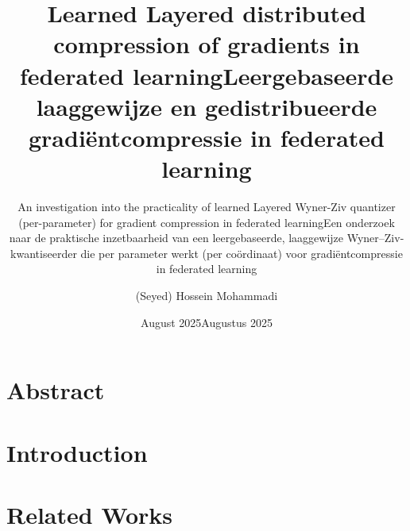 \documentclass[a4paper]{book}
\title{Learned Layered distributed compression of gradients in federated learning}
\subtitle{An investigation into the practicality of learned Layered Wyner-Ziv quantizer (per-parameter) for gradient compression in federated learning}
\author{(Seyed) Hossein Mohammadi}
\date{August 2025}
\begin{document}
\frontmatter
\maketitle%

\title{Leergebaseerde laaggewijze en gedistribueerde gradiëntcompressie in federated learning}
 \subtitle{Een onderzoek naar de praktische inzetbaarheid van een leergebaseerde, laaggewijze Wyner–Ziv-kwantiseerder die per parameter werkt (per coördinaat) voor gradiëntcompressie in federated learning}
\date{Augustus 2025}%
%
\maketitle%

\chapter*{Abstract}


\tableofcontents%


\mainmatter%

\listoffigures
\listoftables

\chapter{Introduction}





\chapter{Related Works}




\end{document}
